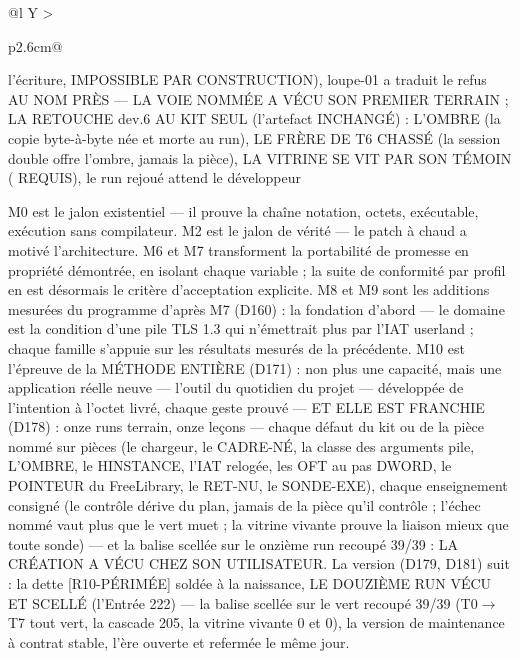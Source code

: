 \begin{table}[htbp]
\begin{tabularx}{\textwidth}{@{}l Y >{\raggedright\arraybackslash}p{2.6cm}@{}}
l'écriture, IMPOSSIBLE PAR CONSTRUCTION), loupe-01 a traduit le refus AU NOM PRÈS — LA VOIE NOMMÉE A VÉCU SON PREMIER TERRAIN ; LA RETOUCHE dev.6 AU KIT SEUL (l'artefact INCHANGÉ) : L'OMBRE  (la copie byte-à-byte née et morte au run), LE FRÈRE DE T6 CHASSÉ (la session double offre l'ombre, jamais la pièce), LA VITRINE SE VIT PAR SON TÉMOIN ( REQUIS), le run rejoué attend le développeur \\
\bottomrule
\end{tabularx}
\end{table}

M0 est le jalon existentiel — il prouve la chaîne notation, octets, exécutable, exécution
sans compilateur. M2 est le jalon de vérité — le patch à chaud a motivé l'architecture.
M6 et M7 transforment la portabilité de promesse en propriété démontrée, en isolant chaque
variable ; la suite de conformité par profil en est désormais le critère d'acceptation
explicite. M8 et M9 sont les additions mesurées du programme d'après M7 (D160) : la
fondation d'abord — le domaine  est la condition d'une pile TLS 1.3 qui
n'émettrait plus par l'IAT userland ; chaque famille s'appuie sur les résultats
mesurés de la précédente. M10 est l'épreuve de la MÉTHODE ENTIÈRE (D171) : non plus
une capacité, mais une application réelle neuve — l'outil du quotidien du projet —
développée de l'intention à l'octet livré, chaque geste prouvé — ET ELLE EST
FRANCHIE (D178) : onze runs terrain, onze leçons — chaque défaut du kit ou de la
pièce nommé sur pièces (le chargeur, le CADRE-NÉ, la classe des arguments pile,
L'OMBRE, le HINSTANCE, l'IAT relogée, les OFT au pas DWORD, le POINTEUR du
FreeLibrary, le RET-NU, le SONDE-EXE), chaque enseignement consigné (le contrôle
dérive du plan, jamais de la pièce qu'il contrôle ; l'échec nommé vaut plus que
le vert muet ; la vitrine vivante prouve la liaison mieux que toute sonde) — et
la balise  scellée sur le onzième run recoupé 39/39 : LA
CRÉATION A VÉCU CHEZ SON UTILISATEUR. La version  (D179, D181)
suit : la dette [R10-PÉRIMÉE] soldée à la naissance, LE DOUZIÈME RUN VÉCU ET
SCELLÉ (l'Entrée 222) — la balise  scellée sur le vert
recoupé 39/39 (T0$\to$T7 tout vert, la cascade 205, la vitrine vivante
0 et 0), la version de maintenance à contrat stable, l'ère ouverte et
refermée le même jour.

